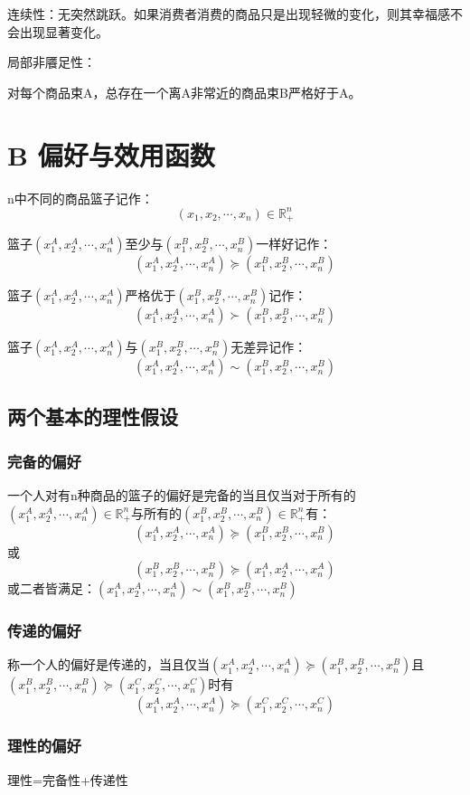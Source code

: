 \documentclass{article}
\begin{document}
\hspace*{\fill}

连续性：无突然跳跃。如果消费者消费的商品只是出现轻微的变化，则其幸福感不会出现显著变化。

\hspace*{\fill}

局部非餍足性：

对每个商品束A，总存在一个离A非常近的商品束B严格好于A。

\section{B 偏好与效用函数}
n中不同的商品篮子记作：
\[
(x_1,x_2,\cdots,x_n)\in \mathbb{R}^n_+
\]

篮子$ (x_1^A,x_2^A,\cdots,x_n^A) $至少与$ (x_1^B,x_2^B,\cdots,x_n^B) $一样好记作：
\[
(x_1^A,x_2^A,\cdots,x_n^A)\succeq(x_1^B,x_2^B,\cdots,x_n^B)
\]

篮子$ (x_1^A,x_2^A,\cdots,x_n^A) $严格优于$ (x_1^B,x_2^B,\cdots,x_n^B) $记作：
\[
(x_1^A,x_2^A,\cdots,x_n^A)\succ(x_1^B,x_2^B,\cdots,x_n^B)
\]

篮子$ (x_1^A,x_2^A,\cdots,x_n^A) $与$ (x_1^B,x_2^B,\cdots,x_n^B) $无差异记作：
\[
(x_1^A,x_2^A,\cdots,x_n^A)\sim(x_1^B,x_2^B,\cdots,x_n^B)
\]
\subsection{两个基本的理性假设}
\subsubsection{完备的偏好}
一个人对有n种商品的篮子的偏好是完备的当且仅当对于所有的$ (x_1^A,x_2^A,\cdots,x_n^A)\in \mathbb{R}^n_+ $与所有的$ (x_1^B,x_2^B,\cdots,x_n^B)\in \mathbb{R}^n_+ $有：
\[
(x_1^A,x_2^A,\cdots,x_n^A)\succeq(x_1^B,x_2^B,\cdots,x_n^B)
\]
或
\[
(x_1^B,x_2^B,\cdots,x_n^B)\succeq(x_1^A,x_2^A,\cdots,x_n^A)
\]
或二者皆满足：$ (x_1^A,x_2^A,\cdots,x_n^A)\sim(x_1^B,x_2^B,\cdots,x_n^B)
 $

\subsubsection{传递的偏好}
称一个人的偏好是传递的，当且仅当$ (x_1^A,x_2^A,\cdots,x_n^A)\succeq(x_1^B,x_2^B,\cdots,x_n^B) $且$ (x_1^B,x_2^B,\cdots,x_n^B)\succeq(x_1^C,x_2^C,\cdots,x_n^C) $时有
\[
(x_1^A,x_2^A,\cdots,x_n^A)\succeq(x_1^C,x_2^C,\cdots,x_n^C)
\]

\subsubsection{理性的偏好}
理性=完备性+传递性
\end{document}
